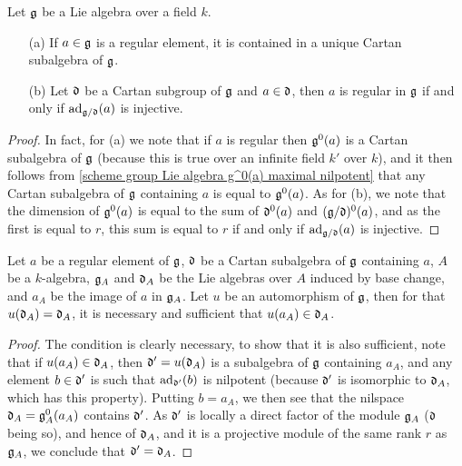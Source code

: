 \begin{proposition}\label{scheme group Lie algebra regular element in unique Cartan subgroup}
Let $\mathfrak{g}$ be a Lie algebra over a field $k$.
\begin{enumerate}
    \item[(a)] If $a\in\mathfrak{g}$ is a regular element, it is contained in a unique Cartan subalgebra of $\mathfrak{g}$.
    \item[(b)] Let $\mathfrak{d}$ be a Cartan subgroup of $\mathfrak{g}$ and $a\in\mathfrak{d}$, then $a$ is regular in $\mathfrak{g}$ if and only if $\mathrm{ad}_{\mathfrak{g}/\mathfrak{d}}(a)$ is injective.
\end{enumerate}
\end{proposition}
\begin{proof}
In fact, for (a) we note that if $a$ is regular then $\mathfrak{g}^0(a)$ is a Cartan subalgebra of $\mathfrak{g}$ (because this is true over an infinite field $k'$ over $k$), and it then follows from \cref{scheme group Lie algebra g^0(a) maximal nilpotent} that any Cartan subalgebra of $\mathfrak{g}$ containing $a$ is equal to $\mathfrak{g}^0(a)$. As for (b), we note that the dimension of $\mathfrak{g}^0(a)$ is equal to the sum of $\mathfrak{d}^0(a)$ and $(\mathfrak{g}/\mathfrak{d})^0(a)$, and as the first is equal to $r$, this sum is equal to $r$ if and only if $\mathrm{ad}_{\mathfrak{g}/\mathfrak{d}}(a)$ is injective.
\end{proof}

\begin{corollary}\label{scheme group Cartan subalgebra automorphism fix iff regular element}
Let $a$ be a regular element of $\mathfrak{g}$, $\mathfrak{d}$ be a Cartan subalgebra of $\mathfrak{g}$ containing $a$, $A$ be a $k$-algebra, $\mathfrak{g}_A$ and $\mathfrak{d}_A$ be the Lie algebras over $A$ induced by base change, and $a_A$ be the image of $a$ in $\mathfrak{g}_A$. Let $u$ be an automorphism of $\mathfrak{g}$, then for that $u(\mathfrak{d}_A)=\mathfrak{d}_A$, it is necessary and sufficient that $u(a_A)\in\mathfrak{d}_A$.
\end{corollary}
\begin{proof}
The condition is clearly necessary, to show that it is also sufficient, note that if $u(a_A)\in\mathfrak{d}_A$, then $\mathfrak{d}'=u(\mathfrak{d}_A)$ is a subalgebra of $\mathfrak{g}$ containing $a_A$, and any element $b\in\mathfrak{d}'$ is such that $\mathrm{ad}_{\mathfrak{d}'}(b)$ is nilpotent (because $\mathfrak{d}'$ is isomorphic to $\mathfrak{d}_A$, which has this property). Putting $b=a_A$, we then see that the nilspace $\mathfrak{d}_A=\mathfrak{g}_A^0(a_A)$ contains $\mathfrak{d}'$. As $\mathfrak{d}'$ is locally a direct factor of the module $\mathfrak{g}_A$ ($\mathfrak{d}$ being so), and hence of $\mathfrak{d}_A$, and it is a projective module of the same rank $r$ as $\mathfrak{g}_A$, we conclude that $\mathfrak{d}'=\mathfrak{d}_A$.
\end{proof}


